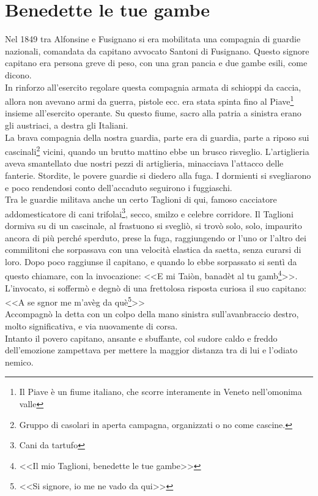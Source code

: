 
\chapter{Benedette le tue gambe}
Nel 1849 tra Alfonsine e Fusignano si era mobilitata una compagnia di guardie nazionali, comandata da capitano avvocato  Santoni di Fusignano. Questo signore capitano era persona greve di peso, con una gran pancia e due gambe esili, come dicono.\\
\indent In rinforzo all'esercito regolare questa compagnia armata di schioppi da caccia, allora non avevano armi da guerra, pistole ecc. era stata spinta fino al Piave\footnote{Il Piave è un fiume italiano, che scorre interamente in Veneto nell'omonima valle} insieme all'esercito operante. Su questo fiume, sacro alla patria a sinistra erano gli austriaci, a destra gli Italiani.\\
\indent La brava compagnia della nostra guardia, parte era di guardia, parte a riposo sui cascinali\footnote{Gruppo di casolari in aperta campagna, organizzati o no come cascine.} vicini, quando un brutto mattino ebbe un brusco risveglio. L'artiglieria aveva smantellato due nostri pezzi di artiglieria, minacciava l'attacco delle fanterie. Stordite, le povere guardie si diedero alla fuga. I dormienti si svegliarono e poco rendendosi conto dell'accaduto seguirono i fuggiaschi.\\
\indent Tra le guardie militava anche un certo Taglioni di qui, famoso cacciatore addomesticatore di cani trifolai\footnote{Cani da tartufo}, secco, smilzo e celebre corridore. Il Taglioni dormiva su di un cascinale, al frastuono si svegliò, si trovò solo, solo, impaurito ancora di più perché sperduto, prese la fuga, raggiungendo or l'uno or l'altro dei commilitoni che sorpassava con una velocità elastica da saetta, senza curarsi di loro. Dopo poco raggiunse il capitano, e quando lo ebbe sorpassato si sentì da questo chiamare, con la invocazione: <<E mi Taiòn, banadèt al tu gamb\footnote{<<Il mio Taglioni, benedette le tue gambe>>}>>.\\
\indent L'invocato, si soffermò e degnò di una frettolosa risposta curiosa il suo capitano: <<A se sgnor me m'avèg da què\footnote{<<Si signore, io me ne vado da qui>>}>>\\
\indent Accompagnò la detta con un colpo della mano sinistra sull'avanbraccio destro, molto significativa, e via nuovamente di corsa.\\
\indent Intanto il povero capitano, ansante e sbuffante, col sudore caldo e freddo dell'emozione zampettava per mettere la maggior distanza tra di lui e l'odiato nemico.\\
